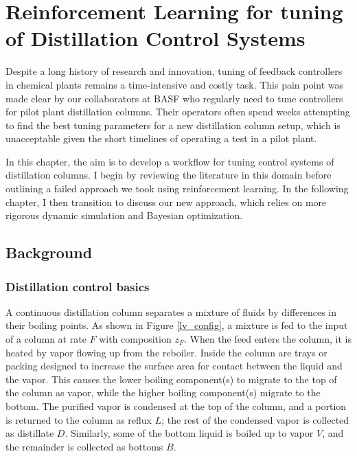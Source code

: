 \chapter{Reinforcement Learning for tuning of  Distillation Control Systems}\label{ch:rl_tuning} 
Despite a long history of research and innovation, tuning of feedback controllers in chemical plants remains a time-intensive and costly task. This pain point was made clear by our collaborators at BASF who regularly need to tune controllers for pilot plant distillation columns. Their operators often spend weeks attempting to find the best tuning parameters for a new distillation column setup, which is unacceptable given the short timelines of operating a test in a pilot plant.

In this chapter, the aim is to develop a workflow for tuning control systems of distillation columns. I begin by reviewing the literature in this domain before outlining a failed approach we took using reinforcement learning.  In the following chapter, I then transition to discuss our new approach, which relies on more rigorous dynamic simulation and Bayesian optimization.

\section{Background}


\subsection{Distillation control basics}
A continuous distillation column separates a mixture of fluids by differences in their boiling points. As shown in Figure \ref{lv_config}, a mixture is fed to the input of a column at rate $F$ with composition $z_F$.  When the feed enters the column, it is heated by vapor flowing up from the reboiler. Inside the column are trays or packing designed to increase the surface area for contact between the liquid and the vapor. This causes the lower boiling component(s) to migrate to the top of the column as vapor, while the higher boiling component(s) migrate to the bottom. The purified vapor is condensed at the top of the column, and a portion is returned to the column as reflux $L$; the rest of the condensed vapor is collected as distillate $D$. Similarly, some of the bottom liquid is boiled up to vapor $V$, and the remainder is collected as bottoms $B$.


